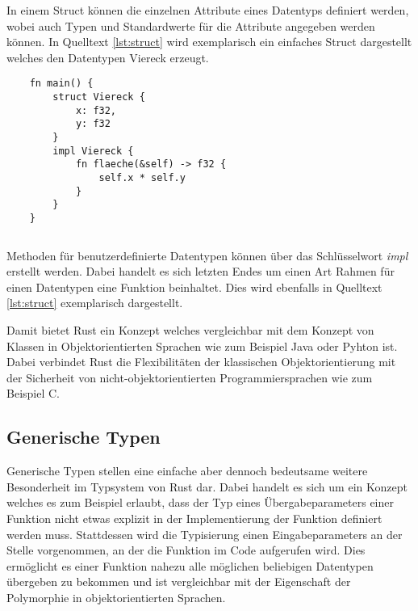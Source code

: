 In einem Struct können die einzelnen Attribute eines Datentyps definiert werden, wobei auch Typen und Standardwerte für die Attribute angegeben werden können. \autocite{rust-the-book}\autocite{rust-by-example} In Quelltext \ref{lst:struct} wird exemplarisch ein einfaches Struct dargestellt welches den Datentypen Viereck erzeugt. 

\begin{verbatim}
    fn main() {
        struct Viereck {
            x: f32,
            y: f32
        }
        impl Viereck {
            fn flaeche(&self) -> f32 {
                self.x * self.y
            }
        }
    }
\end{verbatim}
\begin{lstlisting}[caption={Einfaches Struct und zugeh"orige Methode \\Quelle: \autocite{rust-the-book}}, label={lst:struct}]
\end{lstlisting}

Methoden für benutzerdefinierte Datentypen können über das Schlüsselwort \textit{impl} erstellt werden. Dabei handelt es sich letzten Endes um einen Art Rahmen für einen Datentypen eine Funktion beinhaltet. Dies wird ebenfalls in Quelltext \ref{lst:struct} exemplarisch dargestellt. 

Damit bietet Rust ein Konzept welches vergleichbar mit dem Konzept von Klassen in Objektorientierten Sprachen wie zum Beispiel Java oder Pyhton ist. Dabei verbindet Rust die Flexibilitäten der klassischen Objektorientierung mit der Sicherheit von nicht-objektorientierten Programmiersprachen wie zum Beispiel C.

\subsection{Generische Typen}

Generische Typen stellen eine einfache aber dennoch bedeutsame weitere Besonderheit im Typsystem von Rust dar. Dabei handelt es sich um ein Konzept welches es zum Beispiel erlaubt, dass der Typ eines Übergabeparameters einer Funktion nicht etwas explizit in der Implementierung der Funktion definiert werden muss. Stattdessen wird die Typisierung einen Eingabeparameters an der Stelle vorgenommen, an der die Funktion im Code aufgerufen wird. \autocite{rust-the-book}\autocite{rust-by-example} Dies ermöglicht es einer Funktion nahezu alle möglichen beliebigen Datentypen übergeben zu bekommen und ist vergleichbar mit der Eigenschaft der Polymorphie in objektorientierten Sprachen. 

